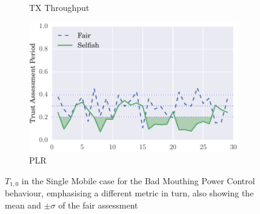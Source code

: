 \documentclass[runningheads,a4paper]{llncs}
\begin{document}
\begin{figure}
\begin{subfigure}{0.32\textwidth}
  \caption{TX Throughput}
  \label{fig:static_badmouthing_txthroughput}
\end{subfigure}
\begin{subfigure}{0.32\textwidth}
\centering
  \includegraphics[width=.95\linewidth]{img/trust_bella_static_emph_PLR_BadMouthingPowerControl.pdf}
  \caption{PLR}
  \label{fig:static_badmouthing_plr}
\end{subfigure}
\caption{$T_{1,0}$ in the Single Mobile case for the Bad Mouthing Power Control behaviour, emphasising a different metric in turn, also showing the mean and $\pm \sigma$ of the fair assessment}
\label{fig:static_badmouthing}
\end{figure}
\end{document}
